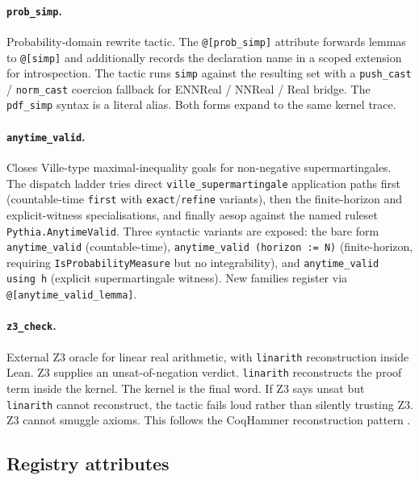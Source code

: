 \paragraph{\texttt{prob\_simp}.}
Probability-domain rewrite tactic. The \texttt{@[prob\_simp]}
attribute forwards lemmas to \texttt{@[simp]} and additionally
records the declaration name in a scoped extension for
introspection. The tactic runs \texttt{simp} against the resulting
set with a \texttt{push\_cast} / \texttt{norm\_cast} coercion
fallback for ENNReal / NNReal / Real bridge. The \texttt{pdf\_simp}
syntax is a literal alias. Both forms expand to the same kernel
trace.

\paragraph{\texttt{anytime\_valid}.}
Closes Ville-type maximal-inequality goals for non-negative
supermartingales. The dispatch ladder tries direct
\texttt{ville\_supermartingale} application paths first (countable-time
\texttt{first} with \texttt{exact}/\texttt{refine} variants), then
the finite-horizon and explicit-witness specialisations, and finally
aesop against the named ruleset
\texttt{Pythia.AnytimeValid}. Three syntactic variants are exposed:
the bare form \texttt{anytime\_valid} (countable-time),
\texttt{anytime\_valid (horizon := N)} (finite-horizon, requiring
\texttt{IsProbabilityMeasure} but no integrability), and
\texttt{anytime\_valid using h} (explicit supermartingale witness).
New families register via \texttt{@[anytime\_valid\_lemma]}.

\paragraph{\texttt{z3\_check}.}
External Z3 oracle for linear real arithmetic, with
\texttt{linarith} reconstruction inside Lean. Z3 supplies an
unsat-of-negation verdict. \texttt{linarith} reconstructs the
proof term inside the kernel. The kernel is the final word. If
Z3 says unsat but \texttt{linarith} cannot reconstruct, the tactic
fails loud rather than silently trusting Z3. Z3 cannot smuggle
axioms. This follows the CoqHammer reconstruction pattern
\citep{czajkakaliszyk2018coqhammer}.

\subsection{Registry attributes}
\label{sec:tactic-surface-registries}

